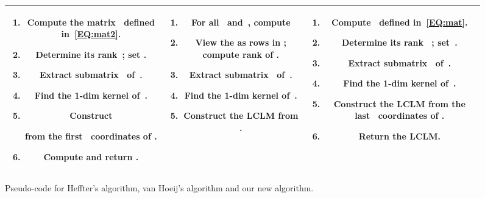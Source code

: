 \documentclass{sig-alt-full}
\begin{document}
\begin{figure*} 
\begin{center} \renewcommand{\arraystretch}{3.7}
	\begin{tabular}{|c|c|c|} \hline
	{
			\begin{minipage}{5.3cm}
			\smallskip
			\center{\bf Heffter's algorithm} 

			\medskip
			\begin{enumerate}
			\item Compute the matrix~ defined in~\eqref{EQ:mat2}. 
			\item Determine its rank~; set . \label{step:rankHeffter}
			\item Extract submatrix~ of~.
			\item Find the 1-dim kernel  of~. \label{step:kernelHeffter} 
			\item Construct 
			 
			from the first~ coordinates of .
			\item Compute and return .\label{step:mulHeffter}
			\end{enumerate}
			\end{minipage}
	}
		& 
		{
		\begin{minipage}{5.3cm}
		\smallskip
		\center{\bf van Hoeij's algorithm} 
		\smallskip
		\begin{enumerate}
		\item For all~ and~, compute
		
		\item View the  as rows in ; compute  rank  of	.\label{step:rankHoeij}
		\item Extract  submatrix~ of~.
		\item Find the 1-dim kernel  of~.\label{step:kernelHoeij}
		\item Construct the LCLM from .
		\end{enumerate}
		\end{minipage}
}	
		&   
		{
		\begin{minipage}{5.3cm}

		\medskip
		\center{\bf Our new algorithm}

		\medskip
		\begin{enumerate}
		\item Compute~ defined in~\eqref{EQ:mat}. 
		\item Determine  its rank~ ; set~.\label{step:rankNew}\item Extract submatrix~ of~.
		\item Find the 1-dim kernel  of~.\label{step:kernelNew}
		\item Construct the LCLM from the last~ coordinates of .
		\item Return the LCLM.
		\end{enumerate}
		\end{minipage}
} \\ 
\hline
\end{tabular}
\caption{Pseudo-code for Heffter's algorithm, van Hoeij's algorithm and our new algorithm.}
\label{fig:Heffter+vH+new}
\end{center}
\end{figure*}
\end{document}
